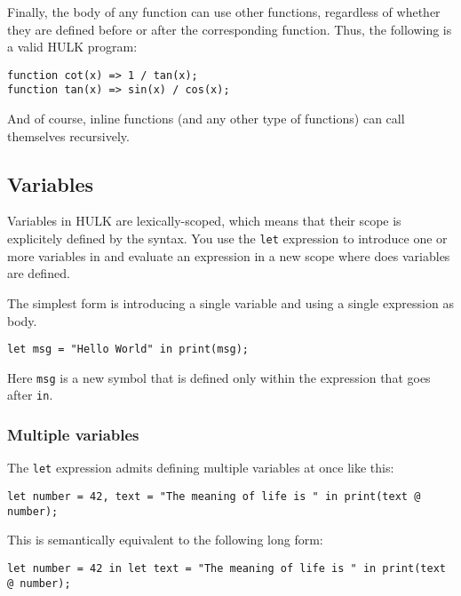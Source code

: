 \documentclass[a4paper, 12pt]{report}
\begin{document}
Finally, the body of any function can use other functions, regardless of whether they are defined before or after the corresponding function.
Thus, the following is a valid HULK program:

\begin{lstlisting}
function cot(x) => 1 / tan(x);
function tan(x) => sin(x) / cos(x);
\end{lstlisting}


And of course, inline functions (and any other type of functions) can call themselves recursively.

\subsection*{Variables}

Variables in HULK are lexically-scoped, which means that their scope is explicitely defined by the syntax. 
You use the {\tt let} expression to introduce one or more variables in and evaluate an expression in 
a new scope where does variables are defined.

The simplest form is introducing a single variable and using a single expression as body.

\begin{lstlisting}
let msg = "Hello World" in print(msg);
\end{lstlisting}

Here {\tt msg} is a new symbol that is defined only within the expression that goes after {\tt in}.

\subsubsection*{Multiple variables}

The {\tt let} expression admits defining multiple variables at once like this:

\begin{lstlisting}
let number = 42, text = "The meaning of life is " in print(text @ number);
\end{lstlisting}

This is semantically equivalent to the following long form:

\begin{lstlisting}
let number = 42 in let text = "The meaning of life is " in print(text @ number); 
\end{lstlisting}
\end{document}
